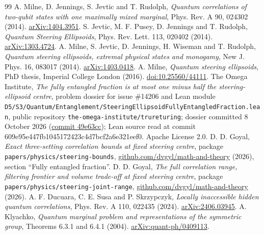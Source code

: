 \documentclass[11pt,a4paper]{article}
\theoremstyle{remark}\newtheorem{remark}[theorem]{Remark}
\begin{document}
\begingroup\small
\begin{thebibliography}{99}
 A. Milne, D. Jennings, S. Jevtic and T. Rudolph, \emph{Quantum correlations of two-qubit states with one maximally mixed marginal}, Phys. Rev. A 90, 024302 (2014). \href{https://arxiv.org/abs/1404.3951}{arXiv:1404.3951}.
 S. Jevtic, M. F. Pusey, D. Jennings and T. Rudolph, \emph{Quantum Steering Ellipsoids}, Phys. Rev. Lett. 113, 020402 (2014). \href{https://arxiv.org/abs/1303.4724}{arXiv:1303.4724}.
 A. Milne, S. Jevtic, D. Jennings, H. Wiseman and T. Rudolph, \emph{Quantum steering ellipsoids, extremal physical states and monogamy}, New J. Phys. 16, 083017 (2014). \href{https://arxiv.org/abs/1403.0418}{arXiv:1403.0418}.
 A. Milne, \emph{Quantum steering ellipsoids}, PhD thesis, Imperial College London (2016). \href{https://doi.org/10.25560/44111}{doi:10.25560/44111}.
 The Omega Institute, \emph{The fully entangled fraction is at most one minus half the steering-ellipsoid centre}, problem dossier for issue \#14206 and Lean module \nolinkurl{D5/S3/Quantum/Entanglement/SteeringEllipsoidFullyEntangledFraction.lean}, public repository \nolinkurl{the-omega-institute/trureturing}; dossier committed 8 October 2026 (\href{https://github.com/the-omega-institute/trureturing/blob/49e63cc2124d91dc82b3e463c6a0fe9b2cc2a6dc/Problems/milne-jennings-jevtic-rudolph-2014-fully-entangled-fraction.md}{commit 49e63cc}); Lean source read at commit 609e95e447fb1045172423c4d7bcf2a6e321eef0. Apache License 2.0.
 D. D. Goyal, \emph{Exact three-setting correlation bounds at fixed steering centre}, package \texttt{papers/physics/steering-bounds}, \href{https://github.com/dvgyl/math-and-theory/tree/main/papers/physics/steering-bounds}{github.com/dvgyl/math-and-theory} (2026), section ``Fully entangled fraction''.
 D. D. Goyal, \emph{The full correlation range, filtering frontier and volume trade-off at fixed steering centre}, package \texttt{papers/physics/steering-joint-range}, \href{https://github.com/dvgyl/math-and-theory/tree/main/papers/physics/steering-joint-range}{github.com/dvgyl/math-and-theory} (2026).
 A. F. Ducuara, C. E. Susa and P. Skrzypczyk, \emph{Locally inaccessible hidden quantum correlations}, Phys. Rev. A 110, 022435 (2024). \href{https://arxiv.org/abs/2406.03945}{arXiv:2406.03945}.
 A. Klyachko, \emph{Quantum marginal problem and representations of the symmetric group}, Theorems 6.3.1 and 6.4.1 (2004). \href{https://arxiv.org/abs/quant-ph/0409113}{arXiv:quant-ph/0409113}.

\end{thebibliography}
\end{document}
